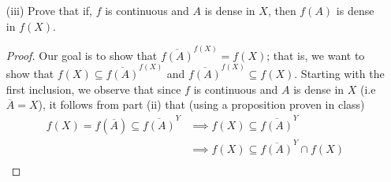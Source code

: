 \documentclass[a4paper]{article}
\begin{document}
\begin{problem}
\begin{enumerate}
\begin{proof}
                \( (\Longleftarrow) \) Let \( C  \) be a closed set in \( Y  \). Our goal is to show that \( f^{-1}(C) \) is closed in \( X  \); that is, we want to show that \( \overline{f^{-1}(C)} = f^{-1}(C) \). Notice that \( f^{-1}(C) \subseteq \overline{f^{-1}(C)} \) is immediate. So, it suffices to show that \( \overline{f^{-1}(C)} \subseteq f^{-1}(C) \). Indeed, by setting \( A = f^{-1}(C) \) which is a subset of \( X  \) and using our assumption, we get that 
                \begin{align*}
                    f(\overline{A}) \subseteq \overline{f(A)} &\implies \overline{A} \subseteq f^{-1}(\overline{f(A)}) \\
                                                              &\implies \overline{f^{-1}(C)} \subseteq f^{-1} \Big[ \overline{f (f^{-1}(C))}\Big] \\
                                                              &\implies \overline{f^{-1}(C)} \subseteq f^{-1}(\overline{C}) \\
                                                              &\implies \overline{f^{-1}(C)} \subseteq f^{-1}(C) \tag{\( \overline{C} = C \) since \( C  \) is closed in \( Y \)}
                \end{align*}
                Since \( \overline{f^{-1}(C)} \subseteq  f^{-1}(C) \) and \( f^{-1}(C) \subseteq \overline{f^{-1}(C)} \), we have \( \overline{f^{-1}(C)} = f^{-1}(C) \) and so we conclude that \( f^{-1}(C) \) is closed in \( X  \). Thus, \( f \) is continuous using part (i).
           \end{proof}
       \item[(iii)] Prove that if, \( f  \) is continuous and \( A  \) is dense in \( X  \), then \( f(A) \) is dense in \( f(X) \).
           \begin{proof}
           Our goal is to show that \( \overline{f(A)}^{f(X)} = f(X) \); that is, we want to show that \( f(X) \subseteq  \overline{f(A)}^{f(X)} \) and \( \overline{f(A)}^{f(X)} \subseteq f(X) \). Starting with the first inclusion, we observe that since \( f  \) is continuous and \( A  \) is dense in \( X  \) (i.e \( \overline{A} = X  \)), it follows from part (ii) that (using a proposition proven in class)
           \begin{align*}  
               f(X) = f(\overline{A}) \subseteq \overline{f(A)}^{Y} &\implies f(X) \subseteq \overline{f(A)}^{Y} \\ 
                                                                    &\implies f(X) \subseteq \overline{f(A)}^{Y} \cap f(X) \\

\end{align*}
\end{proof}
\end{enumerate}
\end{problem}
\end{document}
